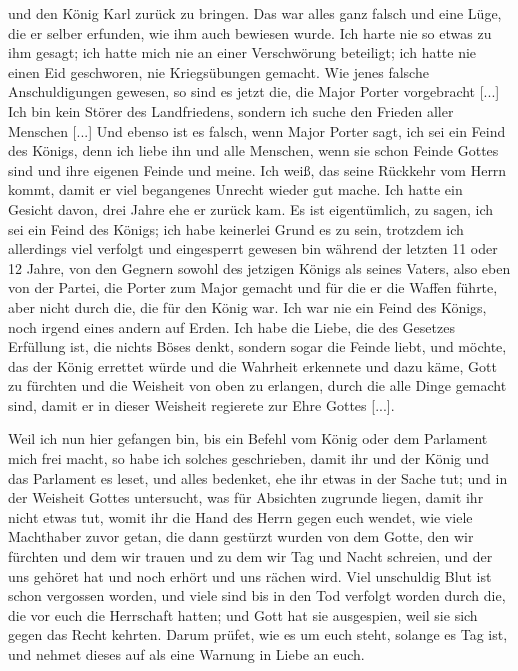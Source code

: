 und den König Karl zurück zu bringen. Das war alles ganz
falsch und eine Lüge, die er selber erfunden, wie ihm auch bewiesen 
wurde. Ich harte nie so etwas zu ihm gesagt; ich hatte
mich nie an einer Verschwörung beteiligt; ich hatte nie einen Eid
geschworen, nie Kriegsübungen gemacht. Wie jenes falsche 
Anschuldigungen gewesen, so sind es jetzt die, die Major Porter 
vorgebracht [...] Ich bin kein Störer des Landfriedens, sondern
ich suche den Frieden aller Menschen [...] Und ebenso ist es
falsch, wenn Major Porter sagt, ich sei ein Feind des Königs,
denn ich liebe ihn und alle Menschen, wenn sie schon Feinde
Gottes sind und ihre eigenen Feinde und meine. Ich weiß, das
seine Rückkehr vom Herrn kommt, damit er viel begangenes Unrecht 
wieder gut mache. Ich hatte ein Gesicht davon, drei Jahre
ehe er zurück kam. Es ist eigentümlich, zu sagen, ich sei ein
Feind des Königs; ich habe keinerlei Grund es zu sein, trotzdem
ich allerdings viel verfolgt und eingesperrt gewesen bin während
der letzten 11 oder 12 Jahre, von den Gegnern sowohl des
jetzigen Königs als seines Vaters, also eben von der Partei, die
Porter zum Major gemacht und für die er die Waffen führte,
aber nicht durch die, die für den König war. Ich war nie ein
Feind des Königs, noch irgend eines andern auf Erden. Ich
habe die Liebe, die des Gesetzes Erfüllung ist, die nichts Böses
denkt, sondern sogar die Feinde liebt, und möchte, das der König
errettet würde und die Wahrheit erkennete und dazu käme, Gott
zu fürchten und die Weisheit von oben zu erlangen, durch die
alle Dinge gemacht sind, damit er in dieser Weisheit regierete zur
Ehre Gottes [...].

Weil ich nun hier gefangen bin, bis ein Befehl vom König
oder dem Parlament mich frei macht, so habe ich solches geschrieben, 
damit ihr und der König und das Parlament es
leset, und alles bedenket, ehe ihr etwas in der Sache tut; und
in der Weisheit Gottes untersucht, was für Absichten zugrunde 
liegen, damit ihr nicht etwas tut, womit ihr die Hand
des Herrn gegen euch wendet, wie viele Machthaber zuvor getan,
die dann gestürzt wurden von dem Gotte, den wir fürchten und
dem wir trauen und zu dem wir Tag und Nacht schreien, und
der uns gehöret hat und noch erhört und uns rächen wird. Viel
unschuldig Blut ist schon vergossen worden, und viele sind bis in
den Tod verfolgt worden durch die, die vor euch die Herrschaft
hatten; und Gott hat sie ausgespien, weil sie sich gegen das
Recht kehrten. Darum prüfet, wie es um euch steht, solange es
Tag ist, und nehmet dieses auf als eine Warnung in Liebe
an euch.\grqq{}

